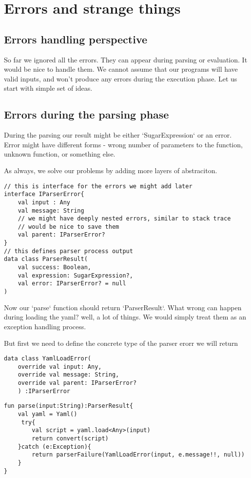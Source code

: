 \documentclass[11pt]{article}
\begin{document}
\section{Errors and strange things}
\label{sec:orge66a45a}
\subsection{Errors handling perspective}
\label{sec:org628af42}
So far we ignored all the errors. They can appear during parsing or evaluation.
It would be nice to handle them. We cannot assume that our programs will have valid inputs, and won't produce any errors during the execution phase.
Let us start with simple set of ideas.
\subsection{Errors during the parsing phase}
\label{sec:orgf6a99de}
During the parsing our result might be either `SugarExpression` or an error.
Error might have different forms - wrong number of parameters to the function, unknown function, or something else.

As always, we solve our problems by adding more layers of abstraciton.

\begin{verbatim}
// this is interface for the errors we might add later
interface IParserError{
    val input : Any
    val message: String
    // we might have deeply nested errors, similar to stack trace
    // would be nice to save them
    val parent: IParserError?
}
// this defines parser process output
data class ParserResult(
    val success: Boolean,
    val expression: SugarExpression?,
    val error: IParserError? = null
)
\end{verbatim}

Now our `parse` function should return `ParserResult`.
What wrong can happen during loading the yaml? well, a lot of things.
We would simply treat them as an exception handling process.

But first we need to define the concrete type of the parser erorr we will return
\begin{verbatim}
data class YamlLoadError(
    override val input: Any,
    override val message: String,
    override val parent: IParserError?
    ) :IParserError
\end{verbatim}

\begin{verbatim}
fun parse(input:String):ParserResult{
    val yaml = Yaml()
     try{
        val script = yaml.load<Any>(input)
        return convert(script)
    }catch (e:Exception){
        return parserFailure(YamlLoadError(input, e.message!!, null))
    }
}
\end{verbatim}
\end{document}
